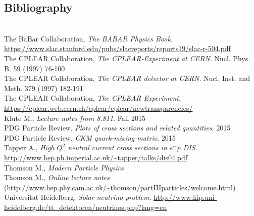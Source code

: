 \documentclass[11pt]{article}
\newcommand{\el}{\ensuremath{e^{-}}\xspace}
\newcommand{\bibspace}{\vspace{5mm}\\\noindent}
\begin{document}
\begin{appendices}
\section{Bibliography}
~
\bibspace The BaBar Collaboration, \emph{The BABAR Physics Book}. \url{https://www.slac.stanford.edu/pubs/slacreports/reports19/slac-r-504.pdf}
\bibspace The CPLEAR Collaboration, \emph{The CPLEAR-Experiment at CERN}. Nucl. Phys. B. 59 (1997) 76-100
\bibspace The CPLEAR Collaboration, \emph{The CPLEAR detector at CERN}. Nucl. Inst. and Meth. 379 (1997) 182-191
\bibspace The CPLEAR Collaboration, \emph{The CPLEAR Experiment}, \url{https://cplear.web.cern.ch/cplear/cplear/newtransparencies/}
\bibspace Klute M., \emph{Lecture notes from 8.811}. Fall 2015
\bibspace PDG Particle Review, \emph{Plots of cross sections and related quantities}. 2015
\bibspace PDG Particle Review, \emph{CKM quark-mixing matrix}. 2015
\bibspace Tapper A., \emph{High $Q^2$ neutral current cross sections in $\el p$ DIS}. \url{http://www.hep.ph.imperial.ac.uk/~tapper/talks/dis04.pdf}
\bibspace Thomson M., \emph{Modern Particle Physics}
\bibspace Thomson M., \emph{Online lecture notes} (\url{http://www.hep.phy.cam.ac.uk/~thomson/partIIIparticles/welcome.html})
\bibspace Universitat Heidelberg, \emph{Solar neutrino problem}. \url{http://www.kip.uni-heidelberg.de/tt_detektoren/neutrinos.php?lang=en}

\end{appendices}
\end{document}
